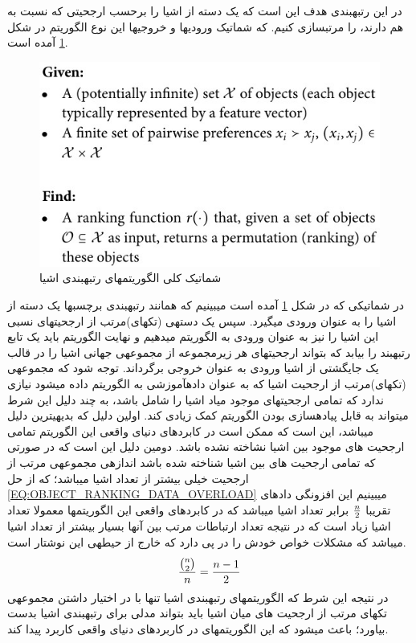 \documentclass{CSICC2016}
\renewcommand{\ }{\hspace{0em}}
\newcommand{\مق}{\lr}
\renewcommand{\یا}{یادگیری\ ارجحیت }
\newcommand{\یم}{یادگیری\ ماشین }
\renewcommand{\تر}{تابع رتبه\ بند }
\newcommand{\ار}{ارجحیت }
\renewcommand{\|}[1][.3em]{\hspace{#1}|\hspace{#1}}
\renewcommand{\,}[1][.3em]{,\hspace{#1}}
\begin{document}
\زیرزیرقسمت{رتبه\ بندی اشیا}
\label{SEC:OBJECT_RANKING}
در این رتبه\ بندی هدف این است که یک دسته از اشیا را برحسب ارجحیتی که نسبت به هم دارند، را مرتب\ سازی کنیم. که شماتیک ورودی\ ها و خروجی\ ها این نوع الگوریتم در شکل
\ref{FIG:OBJECT_RANKING_SCHEMA}
آمده است.
\begin{figure}[H]
    \centering
    \includegraphics[width=.4\textwidth]{object-ranking}
    \caption{شماتیک کلی الگوریتم\ های رتبه\ بندی اشیا}\label{FIG:OBJECT_RANKING_SCHEMA}
\end{figure}
در شماتیکی که در شکل
\ref{FIG:OBJECT_RANKING_SCHEMA}
آمده است می\ بینیم که همانند رتبه\ بندی برچسب\ ها یک دسته از اشیا را به عنوان ورودی می\ گیرد. سپس یک دسته\ ی (تکه\ ای)مرتب از ارجحیت\ های نسبی این اشیا را نیز به عنوان ورودی به الگوریتم می\ دهیم و نهایت الگوریتم باید یک \تر را بیابد که بتواند ارجحیت\ های هر زیرمجموعه از مجموعه\ ی جهانی اشیا را در قالب یک جایگشتی از اشیا ورودی به عنوان خروجی برگرداند.
توجه شود که مجموعه\ ی (تکه\ ای)مرتب از ارجحیت اشیا که به عنوان داده\ آموزشی به الگوریتم داده می\ شود نیازی ندارد که تمامی ارجحیت\ های موجود میاد اشیا را شامل باشد، به چند دلیل این شرط می\ تواند به قابل پیاده\ سازی بودن الگوریتم کمک زیادی کند. اولین دلیل که بدیهی\ ترین دلیل می\ باشد، این است که ممکن است در کابردهای دنیای واقعی این الگوریتم تمامی \ار های موجود بین اشیا نشاخته نشده باشد. دومین دلیل این است که در صورتی که تمامی \ار های بین اشیا شناخته شده باشد اندازه\ ی مجموعه\ ی مرتب از \ار خیلی بیشتر از تعداد اشیا می\ باشد؛ که از حل
\ref{EQ:OBJECT_RANKING_DATA_OVERLOAD}
می\ بینیم این افزونگی داده\ ای تقریبا $n \over 2$ برابر تعداد اشیا می\ باشد که در کابردهای واقعی این الگوریتم\ ها معمولا تعداد اشیا زیاد است که در نتیجه تعداد ارتباطات مرتب بین آنها بسیار بیشتر از تعداد اشیا می\ باشد که مشکلات خواص خودش را در پی دارد که خارج از حیطه\ ی این نوشتار است.
\begin{equation}\label{EQ:OBJECT_RANKING_DATA_OVERLOAD}
{{n \choose 2} \over n} = {n - 1 \over 2}
\end{equation}
در نتیجه این شرط که الگوریتم\ های رتبه\ بندی اشیا تنها با در اختیار داشتن مجموعه\ ی تکه\ ای مرتب از \ار های میان اشیا باید بتواند مدلی برای رتبه\ بندی اشیا بدست بیاورد؛ باعث می\ شود که این الگوریتم\ های در کاربردهای دنیای واقعی کاربرد پیدا کند.
\end{document}
